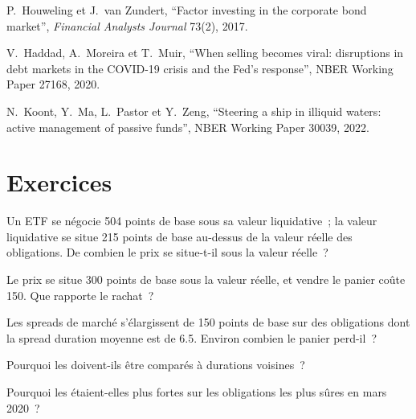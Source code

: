 \begin{omsources}
\item P.~Houweling et J.~van Zundert, ``Factor investing in the corporate bond market'', \emph{Financial Analysts Journal} 73(2), 2017.
\item V.~Haddad, A.~Moreira et T.~Muir, ``When selling becomes viral: disruptions in debt markets in the COVID-19 crisis and the Fed's response'',
NBER Working Paper 27168, 2020.
\item N.~Koont, Y.~Ma, L.~Pastor et Y.~Zeng, ``Steering a ship in illiquid waters: active management of passive funds'', NBER Working Paper 30039,
2022.
\end{omsources}

\section{Exercices}

\begin{exercise}[$\star$]\label{exo:s2:systematic-credit-and-bond-etf-arbitrage:1}
Un ETF se négocie 504 points de base sous sa valeur liquidative~; la valeur liquidative se situe 215 points de base au-dessus de la valeur réelle des obligations. De combien le prix se situe-t-il sous la valeur réelle~?
\end{exercise}

\begin{exercise}[$\star$]\label{exo:s2:systematic-credit-and-bond-etf-arbitrage:2}
Le prix se situe 300 points de base sous la valeur réelle, et vendre le panier coûte 150. Que rapporte le rachat~?
\end{exercise}

\begin{exercise}[$\star$]\label{exo:s2:systematic-credit-and-bond-etf-arbitrage:3}
Les spreads de marché s'élargissent de 150 points de base sur des obligations dont la spread duration moyenne est de 6.5. Environ combien le panier perd-il~?
\end{exercise}

\begin{exercise}[$\star\star$]\label{exo:s2:systematic-credit-and-bond-etf-arbitrage:4}
Pourquoi les  doivent-ils être comparés à durations voisines~?
\end{exercise}

\begin{exercise}[$\star\star$]\label{exo:s2:systematic-credit-and-bond-etf-arbitrage:5}
Pourquoi les  étaient-elles plus fortes sur les obligations les plus sûres en mars 2020~?
\end{exercise}

